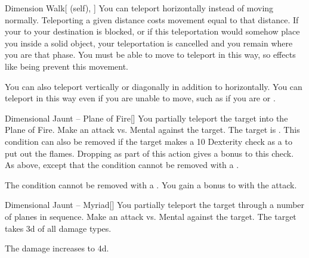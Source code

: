 \lowercase{\hypertarget{spell:Dimension Walk}{}}\label{spell:Dimension Walk}
\begin{attuneability}[Rank 4]{\hypertarget{spell:Dimension Walk}{Dimension Walk}}[ (self), ]
You can teleport horizontally instead of moving normally.
Teleporting a given distance costs movement equal to that distance.
If your  to your destination is blocked, or if this teleportation would somehow place you inside a solid object, your teleportation is cancelled and you remain where you are that phase.
You must be able to move to teleport in this way, so effects like being  prevent this movement.

\rankline
{} You can also teleport vertically or diagonally in addition to horizontally.
 You can teleport in this way even if you are unable to move, such as if you are  or .

\end{attuneability}
\vspace{0.25em}



\lowercase{\hypertarget{spell:Dimensional Jaunt -- Plane of Fire}{}}\label{spell:Dimensional Jaunt -- Plane of Fire}
\begin{freeability}[Rank 4]{\hypertarget{spell:Dimensional Jaunt -- Plane of Fire}{Dimensional Jaunt -- Plane of Fire}}[]
You partially teleport the target into the Plane of Fire.
Make an attack vs. Mental against the target.
\hit The target is .
This condition can also be removed if the target makes a  10 Dexterity check as a  to put out the flames.
Dropping  as part of this action gives a  bonus to this check.
\crit As above, except that the condition cannot be removed with a .

\rankline
{} The condition cannot be removed with a .
 You gain a  bonus to  with the attack.

\end{freeability}
\vspace{0.25em}



\lowercase{\hypertarget{spell:Dimensional Jaunt -- Myriad}{}}\label{spell:Dimensional Jaunt -- Myriad}
\begin{freeability}[Rank 5]{\hypertarget{spell:Dimensional Jaunt -- Myriad}{Dimensional Jaunt -- Myriad}}[]
You partially teleport the target through a number of planes in sequence.
Make an attack vs. Mental against the target.
\hit The target takes  \plus3d of all damage types.

\rankline
{} The damage increases to  \plus4d.

\end{freeability}
\vspace{0.25em}




